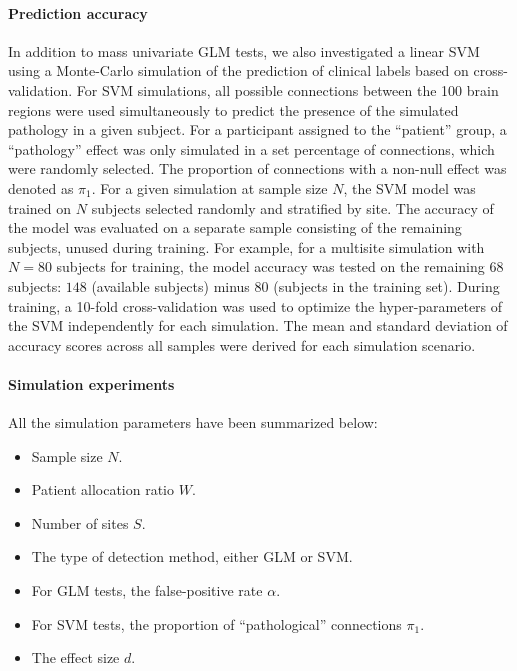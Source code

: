 \documentclass[authoryear]{elsarticle}
\begin{document}
\paragraph{Prediction accuracy}
In addition to mass univariate GLM tests, we also investigated a linear SVM
\citep{Cortes1995} using a Monte-Carlo simulation of the prediction of clinical labels based on cross-validation. For SVM simulations, all possible connections between the 100
brain regions were used simultaneously to predict the presence of the simulated
pathology in a given subject. For a participant assigned to the ``patient''
group, a ``pathology'' effect was only simulated in a set percentage of
connections, which were randomly selected. The proportion of connections with a
non-null effect was denoted as $\pi_1$. For a given simulation at sample size
$N$, the SVM model was trained on $N$ subjects selected randomly and stratified
by site. The accuracy of the model was evaluated on a separate sample consisting of the remaining subjects, unused during training. For example, for a multisite simulation with $N=80$ subjects for training, the model accuracy was tested on the remaining $68$ subjects: $148$ (available subjects) minus $80$ (subjects in the training set). During training, a 10-fold cross-validation was used to optimize the hyper-parameters of the SVM independently for each
simulation. The mean and standard deviation of accuracy scores across all
samples were derived for each simulation scenario.

\paragraph{Simulation experiments}

All the simulation parameters have been summarized below: 
\begin{itemize}
 \item Sample size $N$. 
 \item Patient allocation ratio $W$. 
 \item Number of sites $S$. 
 \item The type of detection method, either GLM or SVM. 
 \item For GLM tests, the false-positive rate $\alpha$. 
 \item For SVM tests, the proportion of ``pathological'' connections $\pi_1$.
 \item The effect size $d$. 
\end{itemize}
\end{document}
